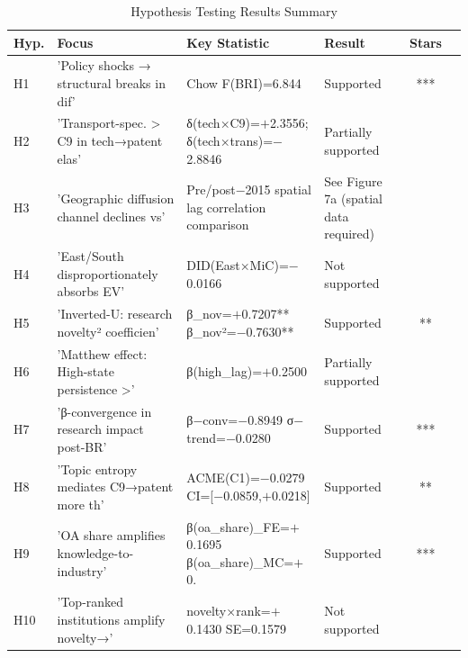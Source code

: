 \begin{table}[htbp]
\centering
\caption{Hypothesis Testing Results Summary}
\label{tab:hypothesis}
\small
\begin{tabular}{llp{5cm}p{4cm}cc}
\toprule
Hyp. & Focus & Key Statistic & Result & Stars \\
\midrule
H1 & 'Policy shocks → structural breaks in dif' & Chow F(BRI)=6.844 & Supported & *** \\
H2 & 'Transport-spec. > C9 in tech→patent elas' & δ(tech×C9)=$+$2.3556; δ(tech×trans)=$-$2.8846 & Partially supported &  \\
H3 & 'Geographic diffusion channel declines vs' & Pre/post$-$2015 spatial lag correlation comparison & See Figure 7a (spatial data required) &  \\
H4 & 'East/South disproportionately absorbs EV' & DID(East×MiC)=$-$0.0166 & Not supported &  \\
H5 & 'Inverted-U: research novelty² coefficien' & β\_nov=$+$0.7207**  β\_nov²=$-$0.7630** & Supported & ** \\
H6 & 'Matthew effect: High-state persistence >' & β(high\_lag)=$+$0.2500 & Partially supported &  \\
H7 & 'β-convergence in research impact post-BR' & β$-$conv=$-$0.8949  σ$-$trend=$-$0.0280 & Supported & *** \\
H8 & 'Topic entropy mediates C9→patent more th' & ACME(C1)=$-$0.0279 CI=[$-$0.0859,$+$0.0218] & Supported & ** \\
H9 & 'OA share amplifies knowledge-to-industry' & β(oa\_share)\_FE=$+$0.1695  β(oa\_share)\_MC=$+$0. & Supported & *** \\
H10 & 'Top-ranked institutions amplify novelty→' & novelty×rank=$+$0.1430  SE=0.1579 & Not supported &  \\
\bottomrule
\end{tabular}
\end{table}